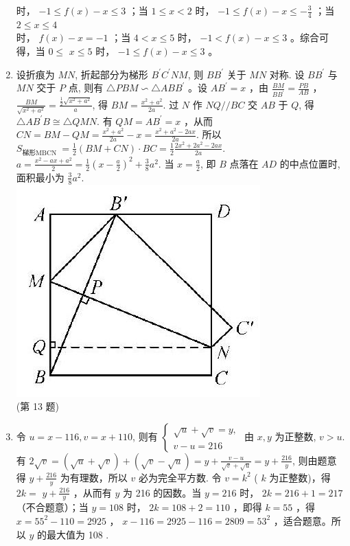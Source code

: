 \documentclass[10pt]{article}
\begin{document}
\begin{enumerate}
时， $-1 \leqslant f(x)-x \leqslant 3$ ；当 $1 \leqslant x<2$ 时， $-1 \leqslant f(x)-x \leqslant-\frac{3}{4}$ ；当 $2 \leqslant x \leqslant 4$\\
时， $f(x)-x=-1$ ；当 $4<x \leqslant 5$ 时， $-1<f(x)-x \leqslant 3$ 。综合可得，当 $0 \leqslant$ $x \leqslant 5$ 时， $-1 \leqslant f(x)-x \leqslant 3$ 。
  \item 设折痕为 $M N$, 折起部分为梯形 $B^{\prime} C^{\prime} N M$, 则 $B B^{\prime}$ 关于 $M N$ 对称. 设 $B B^{\prime}$ 与 $M N$ 交于 $P$ 点, 则有 $\triangle P B M \backsim \triangle A B B^{\prime}$ 。设 $A B^{\prime}=x$ ，由 $\frac{B M}{B B^{\prime}}=\frac{P B}{A B}$ ， $\frac{B M}{\sqrt{x^{2}+a^{2}}}=\frac{\frac{1}{2} \sqrt{x^{2}+a^{2}}}{a}$, 得 $B M=\frac{x^{2}+a^{2}}{2 a}$. 过 $N$ 作 $N Q / / B C$ 交 $A B$ 于 $Q$, 得 $\triangle A B^{\prime} B \cong \triangle Q M N$. 有 $Q M=A B^{\prime}=x$ ，从而 $C N=B M-Q M=\frac{x^{2}+a^{2}}{2 a}-x=\frac{x^{2}+a^{2}-2 a x}{2 a}$. 所以 $S_{\text {梯形MBCN }}=\frac{1}{2}(B M+C N) \cdot B C=\frac{1}{2} \frac{2 x^{2}+2 a^{2}-2 a x}{2 a}$. $a=\frac{x^{2}-a x+a^{2}}{2}=\frac{1}{2}\left(x-\frac{a}{2}\right)^{2}+\frac{3}{8} a^{2}$. 当 $x=\frac{a}{2}$, 即 $B$ 点落在 $A D$ 的中点位置时, 面积最小为 $\frac{3}{8} a^{2}$.\\
\includegraphics[max width=\textwidth, center]{2024_10_30_1bf34f7aeb61f11d11d3g-123}\\
(第 13 题)
  \item 令 $u=x-116, v=x+110$, 则有 $\left\{\begin{array}{l}\sqrt{u}+\sqrt{v}=y, \\ v-u=216\end{array}\right.$ 由 $x, y$ 为正整数, $v>u$. 有 $2 \sqrt{v}=(\sqrt{u}+\sqrt{v})+(\sqrt{v}-\sqrt{u})=y+\frac{v-u}{\sqrt{v}+\sqrt{u}}=y+\frac{216}{y}$, 则由题意得 $y+\frac{216}{y}$ 为有理数，所以 $v$ 必为完全平方数. 令 $v=k^{2}$ ( $k$ 为正整数)，得 $2 k=$ $y+\frac{216}{y}$ ，从而有 $y$ 为 216 的因数。当 $y=216$ 时， $2 k=216+1=217$ （不合题意）；当 $y=108$ 时， $2 k=108+2=110$ ，即得 $k=55$ ，得 $x=55^{2}-110=2925$ ， $x-116=2925-116=2809=53^{2}$ ，适合题意。所以 $y$ 的最大值为 108 .

\end{enumerate}
\end{document}
